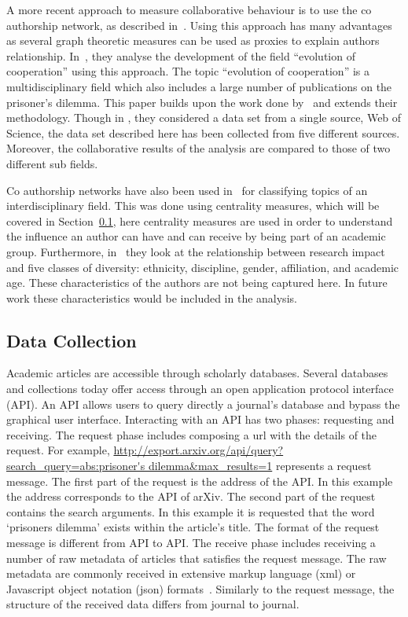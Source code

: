 \documentclass{article}
\theoremstyle{definition}
\begin{document}
A more recent approach to measure collaborative behaviour is to use the co
authorship network, as described in~\cite{Liu2015}. Using this approach has many
advantages as several graph theoretic measures can be used as proxies to explain
authors relationship. In~\cite{Liu2015}, they analyse the development of the
field ``evolution of cooperation'' using this approach. The topic ``evolution of
cooperation'' is a multidisciplinary field which also includes a large number of
publications on the prisoner's dilemma. This paper builds upon the work done
by~\cite{Liu2015} and extends their methodology. Though in \cite{Liu2015}, they
considered a data set from a single source, Web of Science, the data set
described here has been collected from five different sources. Moreover, the
collaborative results of the analysis are compared to those of two different sub
fields.

Co authorship networks have also been used in~\cite{youngblood2018} for
classifying topics of an interdisciplinary field. This was done using centrality
measures, which will be covered in Section~\ref{section:data_collection}, here
centrality measures are used in order to understand the influence an author can
have and can receive by being part of an academic group. Furthermore,
in~\cite{alshebli2018} they look at the relationship between research impact and
five classes of diversity: ethnicity, discipline, gender, affiliation, and
academic age. These characteristics of the authors are not being captured here.
In future work these characteristics would be included in the analysis.

\subsection{Data Collection}\label{section:data_collection}

Academic articles are accessible through scholarly databases. Several databases
and collections today offer access through an open application protocol
interface (API). An API allows users to query directly a journal's database and
bypass the graphical user interface. Interacting with an API has two phases:
requesting and receiving. The request phase includes composing a url with the
details of the request. For example,
\url{http://export.arxiv.org/api/query?search_query=abs:prisoner's
dilemma&max_results=1} represents a request message. The first part of the
request is the address of the API. In this example the address corresponds to
the API of arXiv. The second part of the request contains the search arguments.
In this example it is requested that the word `prisoners dilemma' exists within
the article's title. The format of the request message is different from API to
API. The receive phase includes receiving a number of raw metadata of articles
that satisfies the request message. The raw metadata are commonly received in
extensive markup language (xml) or Javascript object notation (json)
formats~\cite{nurseitov2009}. Similarly to the request message, the structure of
the received data differs from journal
to journal.
\end{document}
